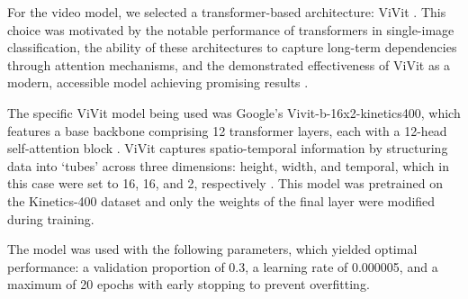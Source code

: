 For the video model, we selected a transformer-based architecture: ViVit \cite{DBLP:journals/corr/abs-2103-15691}. This choice was motivated by the notable performance of transformers in single-image classification, the ability of these architectures to capture long-term dependencies through attention mechanisms, and the demonstrated effectiveness of ViVit as a modern, accessible model achieving promising results \cite{DBLP:journals/corr/abs-2103-15691}.

The specific ViVit model being used was Google’s Vivit-b-16x2-kinetics400, which features a base backbone comprising 12 transformer layers, each with a 12-head self-attention block \cite{DBLP:journals/corr/abs-2103-15691}. ViVit captures spatio-temporal information by structuring data into `tubes' across three dimensions: height, width, and temporal, which in this case were set to 16, 16, and 2, respectively \cite{DBLP:journals/corr/abs-2103-15691}. This model was pretrained on the Kinetics-400 dataset and only the weights of the final layer were modified during training.



The model was used with the following parameters, which yielded optimal performance: a validation proportion of 0.3, a learning rate of 0.000005, and a maximum of 20 epochs with early stopping to prevent overfitting.